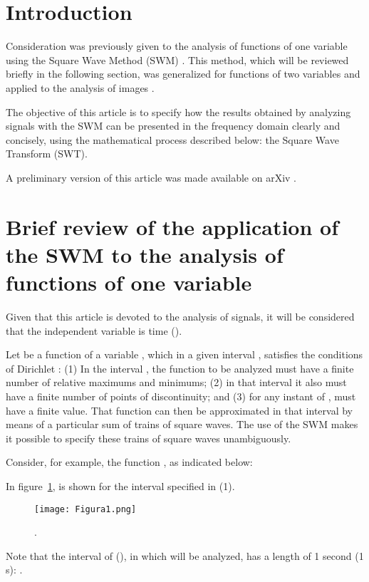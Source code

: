 \documentclass[11pt]{rMTA2010} \usepackage[utf8]{inputenc} \usepackage{graphicx} \usepackage{booktabs} \usepackage{array} \usepackage{enumerate}
\begin{document}
\section{Introduction}

Consideration was previously given to the analysis of functions of one variable using the Square Wave Method (SWM) \cite{b1}. This method, which will be reviewed briefly in the following section, was generalized for functions of two variables and applied to the analysis of images \cite{b2}.

The objective of this article is to specify how the results obtained by analyzing signals with the SWM can be presented in the frequency domain clearly and concisely, using the mathematical process described below: the Square Wave Transform (SWT).

A preliminary version of this article was made available on arXiv \cite{b3a}.

\section{Brief review of the application of the SWM to the analysis of functions of one variable}

Given that this article is devoted to the analysis of signals, it will be considered that the independent variable is time ().

Let  be a function of a variable , which in a given interval , satisfies the conditions of Dirichlet \cite{b3}: (1) In the interval , the function  to be analyzed must have a finite number of relative maximums and minimums; (2) in that interval it also must have a finite number of points of discontinuity; and (3) for any instant of ,  must have a finite value. That function can then be approximated in that interval by means of a particular sum of trains of square waves. The use of the SWM makes it possible to specify these trains of square waves unambiguously.

Consider, for example, the function , as indicated below:



In figure~\ref{f1},  is shown for the interval specified in (1).
\begin{figure}[H]
\centering
\texttt{[image: Figura1.png]}
\caption{.}
\label{f1}
\end{figure}

Note that the interval of  (), in which  will be analyzed, has a length of 1 second (1 s): .
\end{document}
